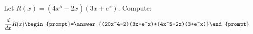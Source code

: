 \documentclass{ximera}
\author{Nela Lakos}
\begin{document}
\begin{exercise}
Let $R(x) = \left(4x^5-2x\right) \left(3x+e^x\right)$. Compute:
\[
\frac{d}{dx}R(x)
\begin{prompt}=\answer{(20x^4-2)(3x+e^x)+(4x^5-2x)(3+e^x)}\end{prompt}
\]
\end{exercise}
\end{document}
